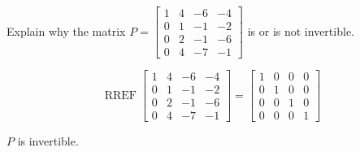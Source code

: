 
\begin{exerciseStatement}


Explain why the matrix \(P= \left[\begin{array}{cccc}
1 & 4 & -6 & -4 \\
0 & 1 & -1 & -2 \\
0 & 2 & -1 & -6 \\
0 & 4 & -7 & -1
\end{array}\right] \) is or is not invertible.


\end{exerciseStatement}
    
\begin{exerciseAnswer} 


\[\operatorname{RREF} \left[\begin{array}{cccc}
1 & 4 & -6 & -4 \\
0 & 1 & -1 & -2 \\
0 & 2 & -1 & -6 \\
0 & 4 & -7 & -1
\end{array}\right] = \left[\begin{array}{cccc}
1 & 0 & 0 & 0 \\
0 & 1 & 0 & 0 \\
0 & 0 & 1 & 0 \\
0 & 0 & 0 & 1
\end{array}\right] \]

\(P\) is invertible.
\end{exerciseAnswer}
    
